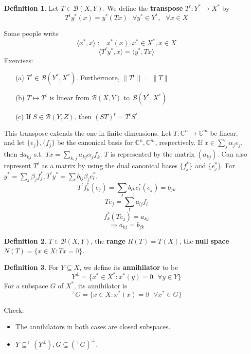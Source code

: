 \documentclass{article}
\theoremstyle{definition}
\newtheorem{dfn}{Definition}
\newcommand{\sfa}{\text{  } \forall}
\begin{document}
\begin{dfn}
	Let $T \in \mathcal{B}(X, Y)$.
	We define the \textbf{transpose} $T^t: Y^* \to X^*$ by 
	\[
		T^t y^*(x) = y^*(Tx) \sfa y^* \in Y^*, \sfa x \in X
	\]
\end{dfn}

Some people write 
\[
	\langle x^*, x\rangle := x^*(x), x^* \in X^*, x \in X
\]
\[
	\langle T^t y^*, x \rangle = \langle y^*, Tx \rangle
\]
Exercises:
\begin{enumerate}
	\item[(a)] $T^t \in \mathcal{B}(Y^*, X^*)$. Furthermore, $\|T^t\| = \|T\|$
		
	\item[(b)] $T \mapsto T^t$ is linear from $\mathcal{B}(X, Y)$ to $\mathcal{B}(Y^*, X^*)$
		
	\item[(c)] If $S \in \mathcal{B}(Y, Z)$, then $(ST)^t = T^t S^t$
\end{enumerate}

This transpose extends the one in finite dimensions.
Let $T:\mathbb{C}^n \to \mathbb{C}^m$ be linear, and let $\{e_j\}, \{f_j\}$ be the canonical basis for $\mathbb{C}^n, \mathbb{C}^m$, respectively.
If $x \in \sum_j \alpha_j e_j$, then $\exists a_{kj}$ s.t. $T x = \sum_{k, j} a_{kj} \alpha_j f_k$.
$T$ is represented by the matrix $(a_{kj})$.
Can also represent $T^t$ as a matrix by using the dual canonical bases $\{f_j^*\}$ and $\{e_j^*\}$.
For $y^* = \sum_{j} \beta_j f_j^*, T^t y^* = \sum b_{lj} \beta_j e_l^*$.
\[
	T^t f_k^*(e_j) = \sum_{l} b_{lk} e_l^*(e_j) = b_{jk}
\]
\[
	T e_j = \sum_l a_{lj} f_l
\]
\[
	f_k^*(T e_j) = a_{kj}
\]
\[
	\Rightarrow a_{kj} = b_{jk}
\]

\begin{dfn}
	$T \in \mathcal{B}(X, Y)$, the \textbf{range} $R(T) = T(X)$, the \textbf{null space} $N(T) = \{x \in X: T x= 0\}$.
\end{dfn}

\begin{dfn}
	For $Y \subseteq X$, we define its \textbf{annihilator} to be 
	\[
		Y^{\perp} = \{x^* \in X^*: x^*(y) = 0 \sfa y \in Y\}
	\]
	For a subspace $G$ of $X^*$, its annihilator is 
	\[
		^\perp G = \{x \in X: x^*(x) = 0 \sfa x^* \in G\}
	\]
\end{dfn}

Check: 
\begin{itemize}
	\item The annihilators in both cases are closed subspaces.	

	\item $Y \subseteq ^\perp (Y^\perp), G \subseteq (^\perp G)^\perp$.
\end{itemize}
\end{document}
